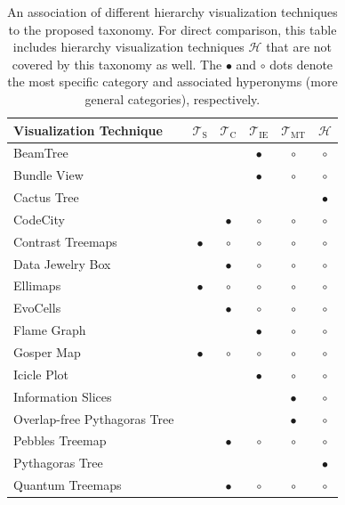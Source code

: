 \documentclass[a4paper,twoside]{article}
\newcommand*\OK{$\circ$}
\newcommand*\OKbf{$\bullet$}
\newcommand*\Ts {$\mathcal{T}_{\mathrm{S}}$}
\newcommand*\Tc {$\mathcal{T}_{\mathrm{C}}$}
\newcommand*\Tie{$\mathcal{T}_{\mathrm{IE}}$}
\newcommand*\Tmt{$\mathcal{T}_{\mathrm{MT}}$}
\newcommand*\Th{$\mathcal{H}$}
\begin{document}
\begin{table}[b]
	\centering
	\scriptsize
	\noindent%
	\setlength{\tabcolsep}{0.75pt}%
	\renewcommand{\arraystretch}{1.03}%
	\caption{%
		An association of different hierarchy visualization techniques to the proposed taxonomy.
		For direct comparison, this table includes hierarchy visualization techniques \Th{} that are not covered by this taxonomy as well.
		The \OKbf{} and \OK{} dots denote the most specific category and associated hyperonyms (more general categories), respectively.%
		\vspace{0.5em}%
	}%
	\label{tab:association}
	\begin{tabularx}{\linewidth}{@{}X|cccc|c@{}}
		\toprule
		\textbf{Visualization Technique} & \Ts  & \Tc & \Tie & \Tmt & \Th \\
		\midrule
		BeamTree~\cite{vanHam2003-beamtrees} & & & \OKbf & \OK & \OK
		\\ Bundle View~\cite{holten2006-edgebundles} & & & \OKbf & \OK & \OK
		\\ Cactus Tree~\cite{dang2017-cactustree} & & & & & \OKbf
		\\ CodeCity~\cite{wettel2008-large} & & \OKbf & \OK & \OK & \OK
		\\ Contrast Treemaps~\cite{tu2007-changes} & \OKbf & \OK & \OK & \OK & \OK
		\\ Data Jewelry Box~\cite{itoh2004-reactanglepacking} & & \OKbf & \OK & \OK & \OK
		\\ Ellimaps~\cite{otjacques2007-ellimaps} & \OKbf & \OK & \OK & \OK & \OK
		\\ EvoCells~\cite{scheibel2018-evocells} & & \OKbf & \OK & \OK & \OK
		\\ Flame Graph~\cite{gregg2016-flamegraphs} & & & \OKbf & \OK & \OK
		\\ Gosper Map~\cite{auber2013-gospermap} & \OKbf & \OK & \OK & \OK & \OK
		\\ Icicle Plot~\cite{kruskal1983-icicle} & & & \OKbf & \OK & \OK
		\\ Information Slices~\cite{andrews1998-slices} & & & & \OKbf & \OK
		\\ Overlap-free Pythagoras Tree~\cite{munz2019-pythagorastrees} & & & & \OKbf & \OK
		\\ Pebbles Treemap~\cite{wetzel2003-pebbles} & & \OKbf & \OK & \OK & \OK
		\\ Pythagoras Tree~\cite{beck2014-pythagorastrees} & & & & & \OKbf
		\\ Quantum Treemaps~\cite{bederson2002-quantum} & & \OKbf & \OK & \OK & \OK

\end{tabularx}
\end{table}
\end{document}
